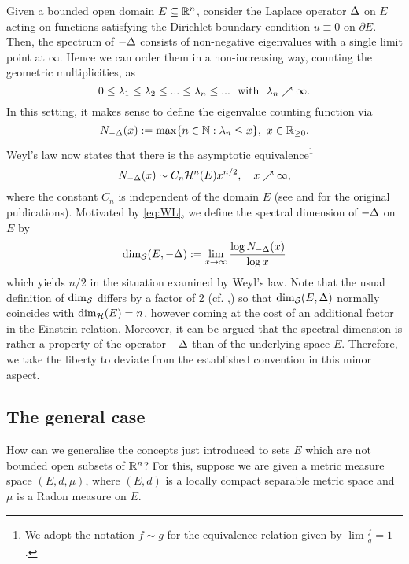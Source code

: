 Given a bounded open domain $E\subseteq\mathbb{R}^n$, consider the Laplace operator $\Delta$ on $E$ acting on functions satisfying the Dirichlet boundary condition $u\equiv0$ on $\partial E$. Then, the spectrum of $-\Delta$ consists of non-negative eigenvalues with a single limit point at $\infty$. Hence we can order them in a non-increasing way, counting the geometric multiplicities, as
\begin{equation}\label{eq:EVs}
  0\leq\gl_1\leq\gl_2\leq...\leq\gl_n\leq...\ \text{ with }\ \gl_n\nearrow\infty. 
\end{equation}
In this setting, it makes sense to define the eigenvalue counting function via 
\begin{equation}\label{eq:DECF}
  N_{-\Delta}(x):=\max\{n\in\mathbb{N}:\lambda_n\leq x\},\ x\in\mathbb{R}_{\geq0}.
\end{equation}
Weyl's law now states that there is the asymptotic equivalence\footnote{We adopt the notation $f\sim g$ for the equivalence relation given by $\lim\frac{f}{g}=1$.}
\begin{equation}\label{eq:WL}
  N_{-\Delta}(x)\sim C_n\mathcal{H}^n(E)x^{n/2},\quad x\nearrow\infty,
\end{equation}
where the constant $C_n$ is independent of the domain $E$ (see \cite{Weyl1911} and \cite{Weyl1912} for the original publications). Motivated by \eqref{eq:WL}, we define the spectral dimension of $-\Delta$ on $E$ by
\begin{equation}\label{eq:dims}
  \dim_{\mathcal{S}}(E,-\Delta):=\lim_{x\to\infty}\frac{\log N_{-\Delta}(x)}{\log x}
\end{equation}
which yields $n/2$ in the situation examined by Weyl's law. Note that the usual definition of $\dim_{\mathcal{S}}$ differs by a factor of 2 (cf. \cite{kigami1993weyl},\cite{hambly_kigami_kumagai_2002}) so that $\dim_{\mathcal{S}}(E,\Delta)$ normally coincides with $\dim_{\mathcal{H}}(E)=n$, however coming at the cost of an additional factor in the Einstein relation. Moreover, it can be argued that the spectral dimension is rather a property of the operator $-\Delta$ than of the underlying space $E$. Therefore, we take the liberty to deviate from the established convention in this minor aspect.

\subsection{The general case}

How can we generalise the concepts just introduced to sets $E$ which are not bounded open subsets of $\mathbb{R}^n$? For this, suppose we are given a metric measure space $(E,d,\mu)$, where $(E,d)$ is a locally compact separable metric space and $\mu$ is a Radon measure on $E$.


